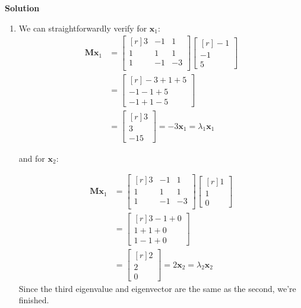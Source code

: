 \documentclass[10pt]{amsart}
\begin{document}
\textbf{Solution} 
\begin{enumerate}
	\item We can straightforwardly verify for $\mathbf{x}_1$:
	\begin{align*}
		\mathbf{M} \mathbf{x}_1 &=  \left[\begin{matrix*}[r]
		3 & -1 & 1 \\
		1 & 1 & 1 \\
		1 & -1 & -3 \\
		\end{matrix*}\right] %
		\left[\begin{matrix*}[r]
		-1 \\ -1 \\ 5
		\end{matrix*}\right] \\
		&= \left[\begin{matrix*}[r]
		-3 +1 +5 \\
		-1 -1 +5 \\
		-1 + 1 -5
		\end{matrix*}\right] \\
		&= \left[\begin{matrix*}[r]
			3 \\ 3 \\ -15
		\end{matrix*}\right] = -3 \mathbf{x}_1 = \lambda_1 \mathbf{x}_1
	\end{align*}
	
	and for $\mathbf{x}_2$:
	
	\begin{align*}
		\mathbf{M} \mathbf{x}_1 &=  \left[\begin{matrix*}[r]
		3 & -1 & 1 \\
		1 & 1 & 1 \\
		1 & -1 & -3 \\
		\end{matrix*}\right] %
		\left[\begin{matrix*}[r]
		1 \\ 1 \\ 0
		\end{matrix*}\right] \\
		&= \left[\begin{matrix*}[r]
		3 -1 + 0 \\
		1 +1 + 0  \\
		1 - 1 + 0
		\end{matrix*}\right] \\
		&= \left[\begin{matrix*}[r]
		2 \\ 2 \\ 0
		\end{matrix*}\right] = 2\mathbf{x}_2 = \lambda_2\mathbf{x}_2
	\end{align*}
	Since the third eigenvalue and eigenvector are the same as the second, we're finished. 
	

\end{enumerate}
\end{document}
